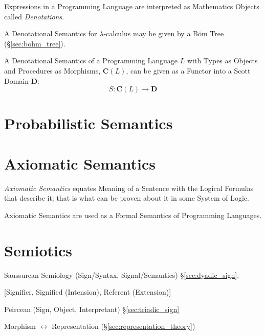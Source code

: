 Expressions in a Programming Language are interpreted as Mathematics
Objects called \emph{Denotations}.

A Denotational Semantics for $\lambda$-calculus may be given by a
B\"om Tree (\S\ref{sec:bohm_tree}).

A Denotational Semantics of a Programming Language $L$ with Types as
Objects and Procedures as Morphisms, $\mathbf{C}(L)$, can be given as
a Functor into a Scott Domain $\mathbf{D}$: \cite{awodey06}
\[
  S : \mathbf{C}(L) \rightarrow \mathbf{D}
\]



\section{Probabilistic Semantics}\label{sec:probabilistic_semantics}



\section{Axiomatic Semantics}\label{sec:axiomatic_semantics}

\emph{Axiomatic Semantics} equates Meaning of a Sentence with the
Logical Formulas that describe it; that is what can be proven about it
in some System of Logic.

Axiomatic Semantics are used as a Formal Semantics of Programming
Languages.



\section{Semiotics}\label{sec:semiotics}

Saussurean Semiology (Sign/Syntax, Signal/Semantics)
\S\ref{sec:dyadic_sign},

[Signifier, Signified (Intension), Referent (Extension)]

Peircean (Sign, Object, Interpretant) \S\ref{sec:triadic_sign}

Morphism $\leftrightarrow$ Representation
(\S\ref{sec:representation_theory})




